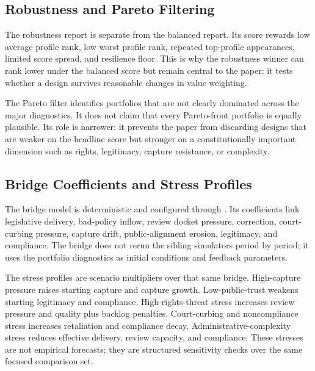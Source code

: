 \documentclass[11pt]{article}
\providecommand{\GeneratedDir}{generated}
\begin{document}







\subsection{Robustness and Pareto Filtering}

The robustness report is separate from the balanced report. Its score rewards low average profile rank, low worst profile rank, repeated top-profile appearances, limited score spread, and resilience floor. This is why the robustness winner can rank lower under the balanced score but remain central to the paper: it tests whether a design survives reasonable changes in value weighting.

The Pareto filter identifies portfolios that are not clearly dominated across the major diagnostics. It does not claim that every Pareto-front portfolio is equally plausible. Its role is narrower: it prevents the paper from discarding designs that are weaker on the headline score but stronger on a constitutionally important dimension such as rights, legitimacy, capture resistance, or complexity.





\subsection{Bridge Coefficients and Stress Profiles}

The bridge model is deterministic and configured through . Its coefficients link legislative delivery, bad-policy inflow, review docket pressure, correction, court-curbing pressure, capture drift, public-alignment erosion, legitimacy, and compliance. The bridge does not rerun the sibling simulators period by period; it uses the portfolio diagnostics as initial conditions and feedback parameters.

The stress profiles are scenario multipliers over that same bridge. High-capture pressure raises starting capture and capture growth. Low-public-trust weakens starting legitimacy and compliance. High-rights-threat stress increases review pressure and quality plus backlog penalties. Court-curbing and noncompliance stress increases retaliation and compliance decay. Administrative-complexity stress reduces effective delivery, review capacity, and compliance. These stresses are not empirical forecasts; they are structured sensitivity checks over the same focused comparison set.
\end{document}
